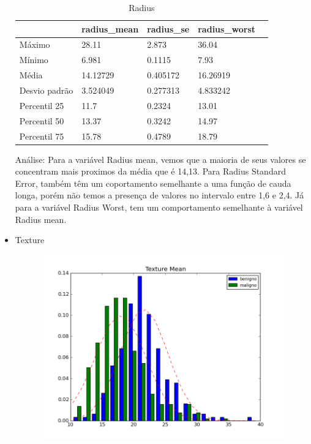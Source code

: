 \documentclass[11pt,a4paper]{article}
\numberwithin{equation}{section}
\begin{document}
\begin{itemize}
\begin{table}[H]
\centering
\caption{Radius}
\label{my-label}
\begin{tabular}{lllll}
\hline
              & radius\_mean & radius\_se & radius\_worst &  \\
\hline
Máximo        & 28.11        & 2.873      & 36.04         &  \\
Mínimo        & 6.981        & 0.1115     & 7.93          &  \\
Média         & 14.12729     & 0.405172   & 16.26919      &  \\
Desvio padrão & 3.524049     & 0.277313   & 4.833242      &  \\
Percentil 25  & 11.7         & 0.2324     & 13.01         &  \\
Percentil 50  & 13.37        & 0.3242     & 14.97         &  \\
Percentil 75  & 15.78        & 0.4789     & 18.79         &  \\
\hline
\end{tabular}
\end{table}


Análise: Para a variável Radius mean, vemos que a maioria de seus valores se concentram mais proximos da média que é 14,13.
Para Radius Standard Error, também têm um coportamento semelhante a uma função de cauda longa, porém não temos a presença de valores no intervalo entre 1,6 e 2,4.
Já para a variável Radius Worst, tem um comportamento semelhante à variável Radius mean.

\item Texture
\begin{figure}[H]
\centering
  \includegraphics[width=.5\linewidth]{../img/hist/texture_mean}
  \label{fig:test1}
\end{figure}%


\end{itemize}
\end{document}
